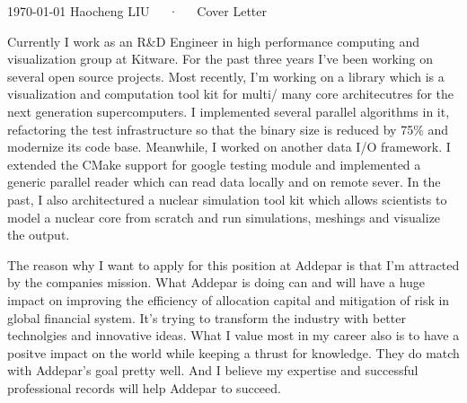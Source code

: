 \documentclass[11pt, a4paper]{awesome-cv}
\begin{document}
\makecvheader[R]

\makecvfooter
  {\today}
  {Haocheng LIU~~~·~~~Cover Letter}
  {}

\makelettertitle

\begin{cvletter}

Currently I work as an R\&D Engineer in high performance computing and visualization group at Kitware. For the past three years I've been working on several open source projects. Most recently, I'm working on a library which is a visualization and computation tool kit for multi/ many core architecutres for the next generation supercomputers. I implemented several parallel algorithms in it, refactoring the test infrastructure so that the binary size is reduced by 75\% and modernize its code base. Meanwhile, I worked on another data I/O framework. I extended the CMake support for google testing module and implemented a generic parallel reader which can read data locally and on remote sever. In the past, I also architectured a nuclear simulation tool kit which allows scientists to model a nuclear core from scratch and run simulations, meshings and visualize the output.

The reason why I want to apply for this position at Addepar is that I'm attracted by the companies mission. What Addepar is doing can and will have a huge impact on improving the efficiency of allocation capital and mitigation of risk in global financial system. It's trying to transform the industry with better technolgies and innovative ideas. What I value most in my career also is to have a positve impact on the world while keeping a thrust for knowledge. They do match with Addepar's goal pretty well. And I believe my expertise and successful professional records will help Addepar to succeed.


\end{cvletter}


\makeletterclosing
\end{document}
